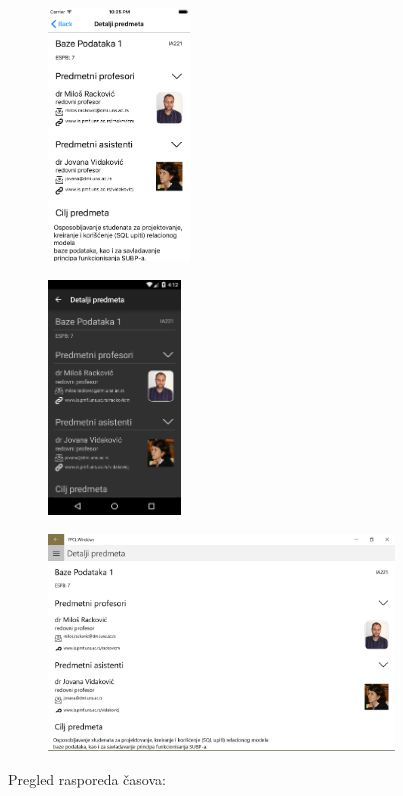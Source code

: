 \documentclass[a4paper]{article}
\begin{document}
\begin{figure}
\centering
\includegraphics[width=37.66mm,height=66.97mm]{msc-img22.png}
\end{figure}
\begin{figure}
\centering
\includegraphics[width=35.1mm,height=62.32mm]{msc-img23.png}
\end{figure}
\begin{figure}
\centering
\includegraphics[width=91.93mm,height=57.45mm]{msc-img24.png}
\end{figure}
Pregled rasporeda časova:
\end{document}
